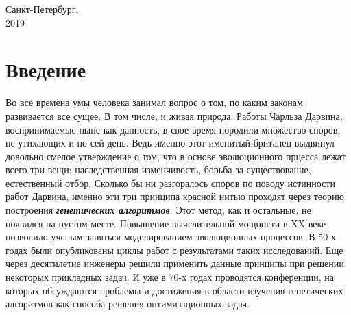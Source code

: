 \vspace{4 cm}

\begin{center}
Санкт-Петербург,\\
2019
\end{center}


\pagestyle{fancy}
\fancyhf{}
\fancyfoot[C]{\thepage}
\renewcommand{\headrulewidth}{0pt}
\renewcommand{\footrulewidth}{0pt}
\tableofcontents
\pagebreak

\newcommand{\defn}[1]{\textbf{\textit{#1}}}

\chapter*{Введение}
Во все времена умы человека занимал вопрос о том, по каким законам развивается все сущее. В том числе, и живая природа. Работы Чарльза Дарвина, воспринимаемые ныне как данность, в свое время породили множество споров, не утихающих и по сей день. Ведь именно этот именитый британец выдвинул довольно смелое утверждение о том, что в основе эволюционного прцесса лежат всего три вещи: наследственная изменчивость, борьба за существование, естественный отбор. Сколько бы ни разгоралось споров по поводу истинности работ Дарвина, именно эти три принципа красной нитью проходят через теорию построения \defn{генетических алгоритмов}.
Этот метод, как и остальные, не появился на пустом месте. Повышение вычслительной мощности в XX веке позволило ученым заняться моделированием эволюционных процессов. В 50-х годах были опубликованы циклы работ с результатами таких исследований. Еще через десятилетие инженеры решили применить данные принципы при решении некоторых прикладных задач. И уже в 70-х годах проводятся конференции, на которых обсуждаются проблемы и достижения в области изучения генетических алгоритмов как способа решения оптимизационных задач.

